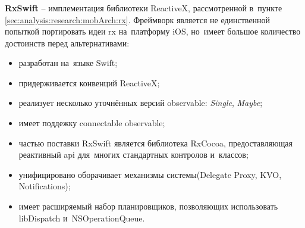 \subsubsection{}
\label{sec:development:arch:ios:rxswift}

\textbf{RxSwift} -- имплементация библиотеки ReactiveX, рассмотренной в~пункте \ref{sec:analysis:research:mobArch:rx}. Фреймворк является не единственной попыткой портировать идеи \gls{rx} на~платформу iOS, но~имеет большое количество достоинств перед альтернативами:

\begin{itemize}
	\item разработан на~языке Swift;
	\item придерживается конвенций ReactiveX;
	\item реализует несколько уточнённых версий \gls{observable}: \textit{Single}, \textit{Maybe};
	\item имеет поддежку connectable \gls{observable};
	\item частью поставки RxSwift является библиотека RxCocoa, предоставляющая реактивный \gls{api} для~многих стандартных контролов и~классов;
	\item унифицировано оборачивает механизмы системы(Delegate Proxy, KVO, Notifications);
	\item имеет расширяемый набор планировщиков, позволяющих использовать libDispatch и~NSOperationQueue.
\end{itemize}